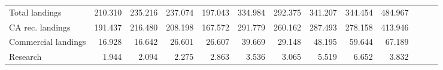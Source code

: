 \documentclass[11pt,
  english,
]{article}
\begin{document}
\begin{table}[H]
{\begin{tabular}[t]{lrrrrrrrrrrrr}
\hspace{1em}Total landings & 210.310 & 235.216 & 237.074 & 197.043 & 334.984 & 292.375 & 341.207 & 344.454 & 484.967 &  &  & \\
\hspace{1em}CA rec. landings & 191.437 & 216.480 & 208.198 & 167.572 & 291.779 & 260.162 & 287.493 & 278.158 & 413.946 &  &  & \\
\hspace{1em}Commercial landings & 16.928 & 16.642 & 26.601 & 26.607 & 39.669 & 29.148 & 48.195 & 59.644 & 67.189 &  &  & \\
\hspace{1em}Research & 1.944 & 2.094 & 2.275 & 2.863 & 3.536 & 3.065 & 5.519 & 6.652 & 3.832 &  &  & \\
\bottomrule
\end{tabular}}
\end{table}
\end{document}
